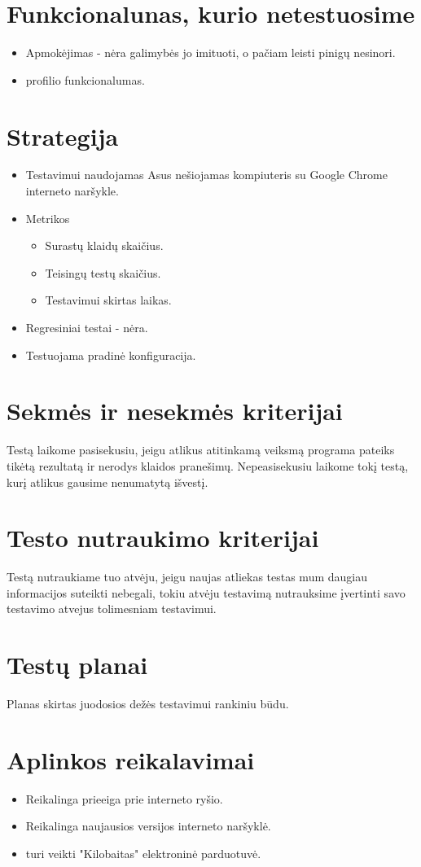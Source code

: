 \documentclass{VUMIFPSkursinis}
\begin{document}
\section{Funkcionalunas, kurio netestuosime}
\begin{itemize}
	\item Apmokėjimas - nėra galimybės jo imituoti, o pačiam leisti pinigų nesinori.
	\item profilio funkcionalumas.
\end{itemize}
\section{Strategija}
\begin{itemize}
	\item Testavimui naudojamas Asus nešiojamas kompiuteris su Google Chrome interneto naršykle.
	\item Metrikos
	\begin{itemize}
		\item Surastų klaidų skaičius.
		\item Teisingų testų skaičius.
		\item Testavimui skirtas laikas.
	\end{itemize}
	\item Regresiniai testai - nėra.
	\item Testuojama pradinė konfiguracija.
\end{itemize}
\section{Sekmės ir nesekmės kriterijai}
Testą laikome pasisekusiu, jeigu atlikus atitinkamą veiksmą programa pateiks tikėtą rezultatą ir nerodys klaidos pranešimų. Nepeasisekusiu laikome tokį testą, kurį atlikus gausime nenumatytą išvestį.
\section{Testo nutraukimo kriterijai}
Testą nutraukiame tuo atvėju, jeigu naujas atliekas testas mum daugiau informacijos suteikti nebegali, tokiu atvėju testavimą nutrauksime įvertinti savo testavimo atvejus tolimesniam testavimui.
\section{Testų planai}
Planas skirtas juodosios dežės testavimui rankiniu būdu.
\section{Aplinkos reikalavimai}
\begin{itemize}
	\item Reikalinga prieeiga prie interneto ryšio.
	\item Reikalinga naujausios versijos interneto naršyklė.
	\item turi veikti "Kilobaitas" elektroninė parduotuvė.
\end{itemize}
\end{document}
